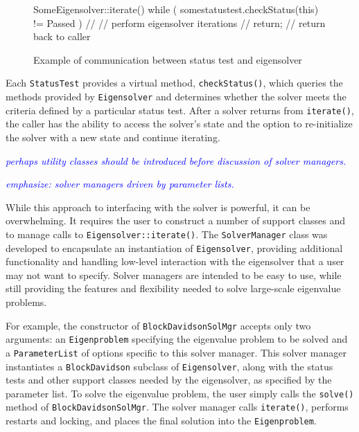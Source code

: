 \documentclass[acmtoms]{acmtrans2m}
\newcommand{\aspace}[1]{\texttt{#1}}
\newcommand{\cbcomm}[1]{\textcolor{blue}{\emph{#1}}}
\begin{document}
\begin{figure}[htb]
\begin{center}
\begin{boxedverbatim}
SomeEigensolver::iterate() {
  while ( somestatustest.checkStatus(this) != Passed ) {
    //
    // perform eigensolver iterations
    //
  }
  return;  // return back to caller
}
\end{boxedverbatim}
\end{center}
\caption{Example of communication between status test and eigensolver}
\label{fig:comm}
\end{figure}

Each \aspace{StatusTest} provides a virtual method,
\verb!checkStatus()!, which queries the methods provided by
\aspace{Eigensolver} and determines whether the solver meets the
criteria defined by a particular status test. After a solver returns
from \verb!iterate()!, the caller has the ability to access the
solver's state and the option to re-initialize the solver with a new
state and continue iterating.

\cbcomm{perhaps utility classes should be introduced before discussion
of solver managers.}

\cbcomm{emphasize: solver managers driven by parameter lists.}

While this approach to interfacing with the solver is powerful, it can be overwhelming. It
requires the user to construct a number of support classes and to manage calls to
\verb!Eigensolver::iterate()!. The \aspace{SolverManager} class was developed to
encapsulate an instantiation of \aspace{Eigensolver}, providing additional functionality
and handling low-level interaction with the eigensolver that a user may not want to
specify. Solver managers are intended to be easy to use, while still providing the
features and flexibility needed to solve large-scale eigenvalue problems.

For example, the constructor of \aspace{BlockDavidsonSolMgr} accepts only two arguments:
an \aspace{Eigenproblem} specifying the eigenvalue problem to be solved and a
\texttt{ParameterList} of options specific to this solver manager. This solver manager
instantiates a \aspace{BlockDavidson} subclass of \aspace{Eigensolver}, along with the
status tests and other support classes needed by the eigensolver, as
specified by the parameter list. To solve the eigenvalue
problem, the user simply calls the \verb!solve()! method of \aspace{BlockDavidsonSolMgr}.
The solver manager calls \verb!iterate()!, performs restarts and locking, and places the
final solution into the \aspace{Eigenproblem}.
\end{document}
